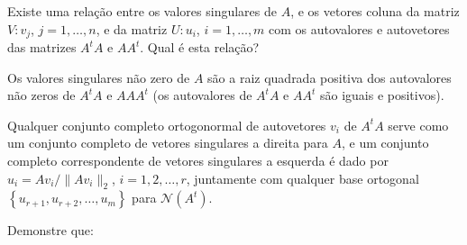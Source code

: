 \begin{questions}
     Existe uma rela\c{c}\~{a}o entre os valores singulares de $A$, e os vetores coluna da matriz $V : v_j$, $j = 1, \ldots, n$, e da matriz $U : u_i$, $i = 1, \ldots, m$ com os autovalores e autovetores das matrizes $A^t A$ e $A A^t$. Qual \'{e} esta rela\c{c}\~{a}o?
    \begin{solution}
        Os valores singulares n\~{a}o zero de $A$ s\~{a}o a raiz quadrada positiva dos autovalores n\~{a}o zeros de $A^t A$ e $A A A^t$ (os autovalores de $A^t A$ e $A A^t$ s\~{a}o iguais e positivos).

        Qualquer conjunto completo ortogonormal de autovetores $v_i$ de $A^t A$ serve como um conjunto completo de vetores singulares a direita para $A$, e um conjunto completo correspondente de vetores singulares a esquerda \'{e} dado por $u_i = A v_i / \| A v_i \|_2$, $i = 1, 2, \ldots, r$, juntamente com qualquer base ortogonal $\left\{ u_{r + 1}, u_{r + 2}, \ldots, u_{m} \right\}$ para $\mathcal{N}(A^t)$.
    \end{solution}

    \question Demonstre que:
\end{questions}
